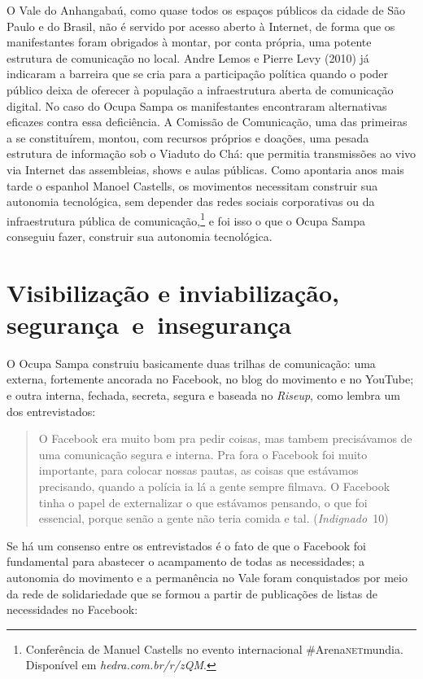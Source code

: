 O Vale do Anhangabaú, como quase todos os espaços públicos da cidade de
São Paulo e do Brasil, não é servido por acesso aberto à Internet, de
forma que os manifestantes foram obrigados à montar, por conta própria,
uma potente estrutura de comunicação no local. Andre Lemos e Pierre Levy
(2010) já indicaram a barreira que se cria para a participação política
quando o poder público deixa de oferecer à população a infraestrutura
aberta de comunicação digital. No caso do Ocupa Sampa os manifestantes
encontraram alternativas eficazes contra essa deficiência. A Comissão de
Comunicação, uma das primeiras a se constituírem, montou, com recursos
próprios e doações, uma pesada estrutura de informação sob o Viaduto do
Chá: que permitia transmissões ao vivo via Internet das assembleias,
shows e aulas públicas. Como apontaria anos mais tarde o espanhol Manoel
Castells, os movimentos necessitam construir sua autonomia tecnológica,
sem depender das redes sociais corporativas ou da infraestrutura pública
de comunicação,\footnote{Conferência de Manuel Castells no evento
  internacional \#Arena\textsc{net}mundia. Disponível em \textit{hedra.com.br/r/zQM}.}
e foi isso o que o Ocupa Sampa conseguiu fazer, construir sua autonomia
tecnológica.

\section{Visibilização e inviabilização, segurança~e~insegurança}

O Ocupa Sampa construiu basicamente duas trilhas de comunicação: uma
externa, fortemente ancorada no Facebook, no blog do movimento e no
YouTube; e outra interna, fechada, secreta, segura e baseada no
\textit{Riseup}, como lembra um dos entrevistados:

\begin{quote}
O Facebook era muito bom pra pedir coisas, mas tambem precisávamos de
uma comunicação segura e interna. Pra fora o Facebook foi muito
importante, para colocar nossas pautas, as coisas que estávamos
precisando, quando a polícia ia lá a gente sempre filmava. O Facebook
tinha o papel de externalizar o que estávamos pensando, o que foi
essencial, porque senão a gente não teria comida e tal. (\textit{Indignado}~10)
\end{quote}

Se há um consenso entre os entrevistados é o fato de que o
Facebook foi fundamental para abastecer o acampamento de todas as
necessidades; a autonomia do movimento e a permanência no Vale foram
conquistados por meio da rede de solidariedade que se formou a partir de
publicações de listas de necessidades no Facebook:


